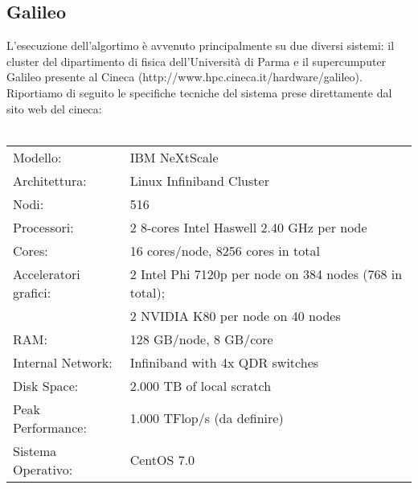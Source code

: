 \subsection{Galileo}
L'esecuzione dell'algortimo è avvenuto principalmente su due diversi
sistemi: il cluster del dipartimento di fisica dell'Università di
Parma e il supercumputer Galileo presente al Cineca
(http://www.hpc.cineca.it/hardware/galileo). Riportiamo di seguito le
specifiche tecniche del sistema prese direttamente dal sito web del
cineca:
\\
\\
\begin{tabular}{l l}
Modello: & IBM NeXtScale \\
Architettura: & Linux Infiniband Cluster \\
Nodi: & 516 \\
Processori: & 2 8-cores Intel Haswell 2.40 GHz per node \\
Cores: & 16 cores/node, 8256 cores in total \\
Acceleratori grafici: & 2 Intel Phi 7120p per node on 384 nodes (768
in total); \\
                      & 2 NVIDIA K80 per node on 40 nodes \\
RAM: & 128 GB/node, 8 GB/core \\
Internal Network: & Infiniband with 4x QDR switches \\
Disk Space: & 2.000 TB of local scratch \\
Peak Performance: & 1.000 TFlop/s (da definire) \\
Sistema Operativo: & CentOS 7.0 \\
\end{tabular}
